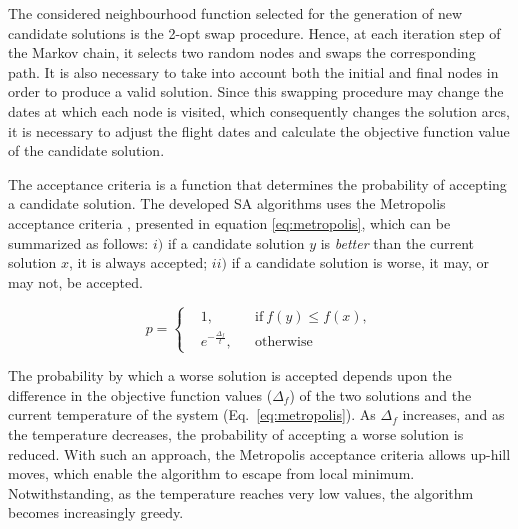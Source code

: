 The considered neighbourhood function selected for the generation of new candidate solutions is the 2-opt swap procedure. Hence, at each iteration step of the Markov chain, it selects two random nodes and swaps the corresponding path. It is also necessary to take into account both the initial and final nodes in order to produce a valid solution. Since this swapping procedure may change the dates at which each node is visited, which consequently changes the solution arcs, it is necessary to adjust the flight dates and calculate the objective function value of the candidate solution.


The acceptance criteria is a function that determines the probability of accepting a candidate solution. The developed SA algorithms uses the Metropolis acceptance criteria \cite{metropolis}, presented in equation \ref{eq:metropolis},  which can be summarized as follows: $i)$ if a candidate solution $y$ is \textit{better} than the current solution $x$, it is always accepted; $ii)$ if a candidate solution is worse, it may, or may not, be accepted. 

\begin{equation}
\label{eq:metropolis}
  p =  \left \{
  \begin{aligned}
    & 1, && \text{if}\ f(y) \leq f(x),\\
    & e^{-\frac{\Delta_f}{t}},&& \text{otherwise}
  \end{aligned} \right. 
\end{equation}

The probability by which a worse solution is accepted depends upon the difference in the objective function values ($\Delta_f$) of the two solutions and the current temperature of the system (Eq.~\ref{eq:metropolis}). As $\Delta_f$ increases, and as the temperature decreases, the probability of accepting a worse solution is reduced. With such an approach, the Metropolis acceptance criteria allows up-hill moves, which enable the algorithm to escape from local minimum. Notwithstanding, as the temperature reaches very low values, the algorithm becomes increasingly greedy.


